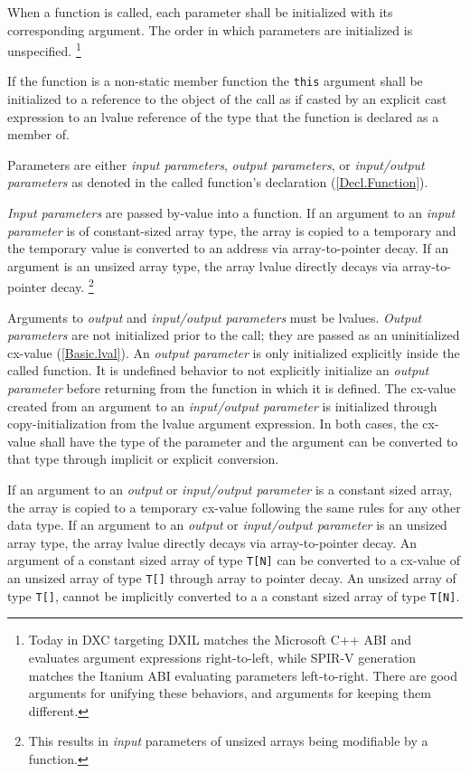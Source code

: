 \p When a function is called, each parameter shall be initialized with its
corresponding argument. The order in which parameters are initialized is
unspecified. \footnote{Today in DXC targeting DXIL matches the Microsoft C++ ABI
and evaluates argument expressions right-to-left, while SPIR-V generation
matches the Itanium ABI evaluating parameters left-to-right. There are good
arguments for unifying these behaviors, and arguments for keeping them
different.}

\p If the function is a non-static member function the \texttt{this} argument
shall be initialized to a reference to the object of the call as if casted by an
explicit cast expression to an lvalue reference of the type that the function is
declared as a member of.

\p Parameters are either \textit{input parameters}, \textit{output parameters},
or \textit{input/output parameters} as denoted in the called function's
declaration (\ref{Decl.Function}).

\p \textit{Input parameters} are passed by-value into a function. If an argument
to an \textit{input parameter} is of constant-sized array type, the array is
copied to a temporary and the temporary value is converted to an address via
array-to-pointer decay. If an argument is an unsized array type, the array
lvalue directly decays via array-to-pointer decay. \footnote{This results in
\textit{input} parameters of unsized arrays being modifiable by a function.}

\p Arguments to \textit{output} and \textit{input/output parameters} must be
lvalues. \textit{Output parameters} are not initialized prior to the call; they
are passed as an uninitialized cx-value (\ref{Basic.lval}). An \textit{output
parameter} is only initialized explicitly inside the called function. It is
undefined behavior to not explicitly initialize an \textit{output parameter}
before returning from the function in which it is defined. The cx-value created
from an argument to an \textit{input/output parameter} is initialized through
copy-initialization from the lvalue argument expression. In both cases, the
cx-value shall have the type of the parameter and the argument can be converted
to that type through implicit or explicit conversion.

\p If an argument to an \textit{output} or \textit{input/output parameter} is a
constant sized array, the array is copied to a temporary cx-value following the
same rules for any other data type. If an argument to an \textit{output} or
\textit{input/output parameter} is an unsized array type, the array lvalue
directly decays via array-to-pointer decay. An argument of a constant sized
array of type \texttt{T[N]} can be converted to a cx-value of an unsized array
of type \texttt{T[]} through array to pointer decay. An unsized array of type
\texttt{T[]}, cannot be implicitly converted to a a constant sized array of type
\texttt{T[N]}.

